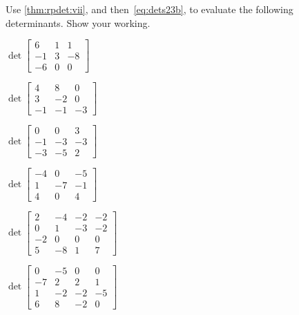\begin{exercise}  
Use \cref{thm:rpdet:vii}, and then~\eqref{eq:dets23b}, to evaluate the following determinants.
Show your working.
\begin{Parts}
\item \(\det\begin{bmatrix} 6 & 1 & 1
\\-1 & 3 & -8
\\-6 & 0 & 0 \end{bmatrix}\)

\item \(\det\begin{bmatrix} 4 & 8 & 0
\\3 & -2 & 0
\\-1 & -1 & -3 \end{bmatrix}\)

\begin{OmitV1}
\item \(\det\begin{bmatrix} 0 & 0 & 3
\\-1 & -3 & -3
\\-3 & -5 & 2 \end{bmatrix}\)

\item \(\det\begin{bmatrix} -4 & 0 & -5
\\1 & -7 & -1
\\4 & 0 & 4 \end{bmatrix}\)
\end{OmitV1}

\item \(\det\begin{bmatrix} 2 & -4 & -2 & -2
\\0 & 1 & -3 & -2
\\-2 & 0 & 0 & 0
\\5 & -8 & 1 & 7 \end{bmatrix}\)

\item \(\det\begin{bmatrix} 0 & -5 & 0 & 0
\\-7 & 2 & 2 & 1
\\1 & -2 & -2 & -5
\\6 & 8 & -2 & 0 \end{bmatrix}\)


\end{Parts}
\end{exercise}
